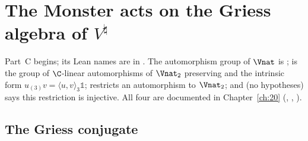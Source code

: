 \section{The Monster acts on the Griess algebra of \texorpdfstring{$V^\natural$}{V-natural}}\label{ch21:sec:action}

Part~C begins; its Lean names are in .  The automorphism group of
$\Vnat$ is ;  is the group of $\C$-linear automorphisms
of $\Vnat_2$ preserving  and the intrinsic form $u_{(3)}v=\langle u,v\rangle_3\mathbb1$;
 restricts an automorphism to $\Vnat_2$; and
 (no hypotheses) says this restriction is injective.  All four are
documented in Chapter~\ref{ch:20} (,
, ).

\subsection{The Griess conjugate}

